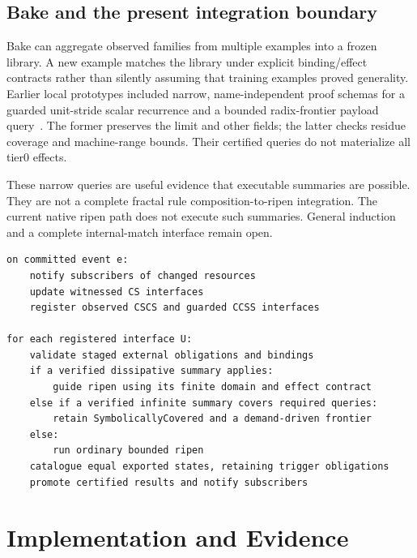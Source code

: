 \documentclass[11pt,a4paper]{article}
\begin{document}
\subsection{Bake and the present integration boundary}
Bake can aggregate observed families from multiple examples into a frozen
library. A new example matches the library under explicit binding/effect
contracts rather than silently assuming that training examples proved generality.
Earlier local prototypes included narrow, name-independent proof schemas
for a guarded unit-stride scalar recurrence and a bounded radix-frontier payload
query~\cite{code}. The former preserves the limit and other fields; the latter
checks residue coverage and machine-range bounds. Their certified queries do not
materialize all tier0 effects.

These narrow queries are useful evidence that executable summaries are possible.
They are not a complete fractal rule composition-to-ripen integration. The current native
ripen path does not execute such summaries. General induction and a
complete internal-match interface remain open.

\begin{lstlisting}[caption={Target feedback protocol. The certified-summary branches are not yet generally integrated.}]
on committed event e:
    notify subscribers of changed resources
    update witnessed CS interfaces
    register observed CSCS and guarded CCSS interfaces

for each registered interface U:
    validate staged external obligations and bindings
    if a verified dissipative summary applies:
        guide ripen using its finite domain and effect contract
    else if a verified infinite summary covers required queries:
        retain SymbolicallyCovered and a demand-driven frontier
    else:
        run ordinary bounded ripen
    catalogue equal exported states, retaining trigger obligations
    promote certified results and notify subscribers
\end{lstlisting}

\section{Implementation and Evidence}
\end{document}
